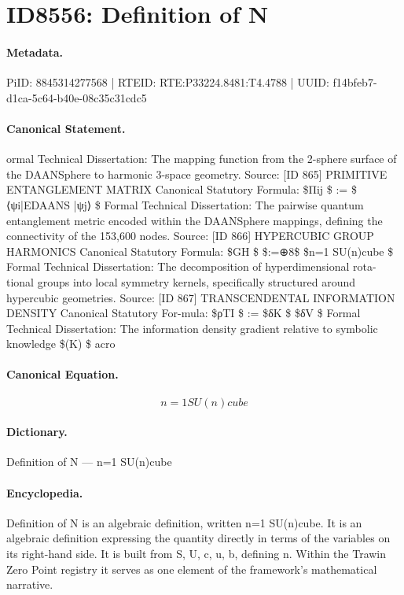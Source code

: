 \section*{ID8556: Definition of N}
\paragraph{Metadata.}
PiID: 8845314277568 | RTEID: RTE:P33224.8481:T4.4788 | UUID: f14bfeb7-d1ca-5c64-b40e-08c35c31cdc5

\paragraph{Canonical Statement.}
ormal Technical Dissertation: The mapping function from the 2-sphere surface of the DAANSphere to harmonic 3-space geometry. Source: [ID 865] PRIMITIVE ENTANGLEMENT MATRIX Canonical Statutory Formula: \$Πij \$ := \$⟨ψi|EDAANS |ψj⟩ \$ Formal Technical Dissertation: The pairwise quantum entanglement metric encoded within the DAANSphere mappings, defining the connectivity of the 153,600 nodes. Source: [ID 866] HYPERCUBIC GROUP HARMONICS Canonical Statutory Formula: \$GH \$ \$:=⊕8\$ \$n=1 SU(n)cube \$ Formal Technical Dissertation: The decomposition of hyperdimensional rota- tional groups into local symmetry kernels, specifically structured around hypercubic geometries. Source: [ID 867] TRANSCENDENTAL INFORMATION DENSITY Canonical Statutory For-mula: \$ρTI \$ := \$δK \$ \$δV \$ Formal Technical Dissertation: The information density gradient relative to symbolic knowledge \$(K) \$ acro

\paragraph{Canonical Equation.}
\[
n=1 SU(n)cube
\]

\paragraph{Dictionary.}
Definition of N — n=1 SU(n)cube

\paragraph{Encyclopedia.}
Definition of N is an algebraic definition, written n=1 SU(n)cube. It is an algebraic definition expressing the quantity directly in terms of the variables on its right-hand side. It is built from S, U, c, u, b, defining n. Within the Trawin Zero Point registry it serves as one element of the framework's mathematical narrative.
